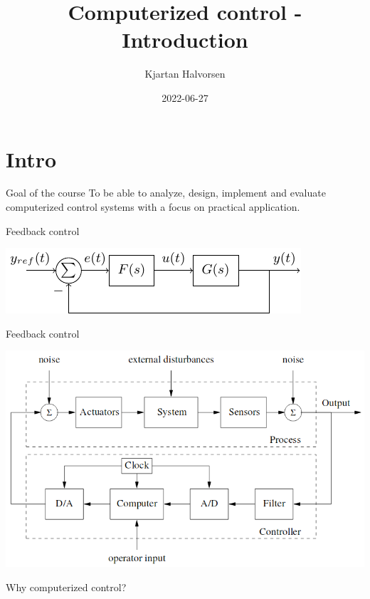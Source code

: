 \documentclass[presentation,aspectratio=169]{beamer}
\author{Kjartan Halvorsen}
\date{2022-06-27}
\title{Computerized control - Introduction}
\begin{document}
\maketitle

\section{Intro}
\label{sec:org801ad02}
\begin{frame}[label={sec:org39cf3e7}]{Goal of the course}
To be able to \alert{analyze}, \alert{design}, \alert{implement} and \alert{evaluate} computerized control systems with a focus on practical application.
\end{frame}

\begin{frame}[label={sec:orgf52f665}]{Feedback control}
\begin{center}
\includegraphics[width=0.6\linewidth]{../../figures/block1}
\end{center}
\end{frame}
\begin{frame}[label={sec:orga775da0}]{Feedback control}
\begin{center}
\includegraphics[width=0.7\linewidth]{../../figures/comp-contr-sys.png}
\end{center}
\end{frame}

\begin{frame}[label={sec:org60b1f50}]{Why computerized control?}
\end{frame}
\end{document}
